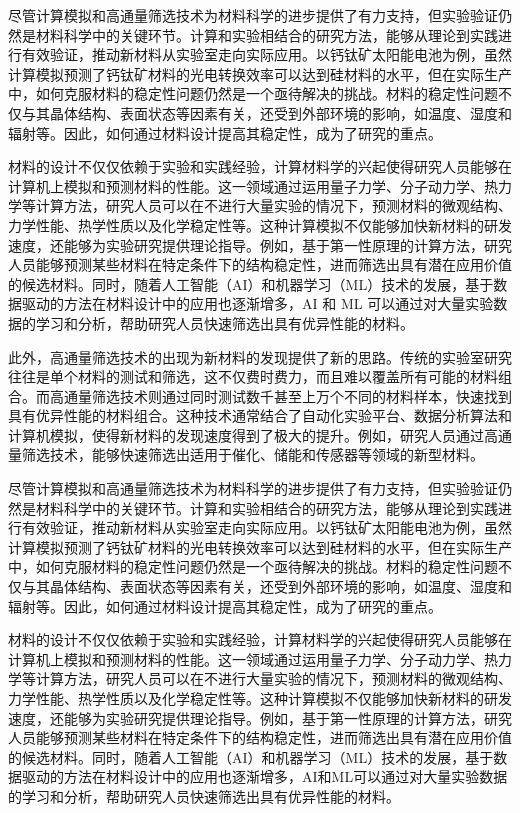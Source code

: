 \begin{multicols}{2}
尽管计算模拟和高通量筛选技术为材料科学的进步提供了有力支持，但实验验证仍然是材料科学中的关键环节。计算和实验相结合的研究方法，能够从理论到实践进行有效验证，推动新材料从实验室走向实际应用。以钙钛矿太阳能电池为例，虽然计算模拟预测了钙钛矿材料的光电转换效率可以达到硅材料的水平，但在实际生产中，如何克服材料的稳定性问题仍然是一个亟待解决的挑战。材料的稳定性问题不仅与其晶体结构、表面状态等因素有关，还受到外部环境的影响，如温度、湿度和辐射等。因此，如何通过材料设计提高其稳定性，成为了研究的重点。

材料的设计不仅仅依赖于实验和实践经验，计算材料学的兴起使得研究人员能够在计算机上模拟和预测材料的性能。这一领域通过运用量子力学、分子动力学、热力学等计算方法，研究人员可以在不进行大量实验的情况下，预测材料的微观结构、力学性能、热学性质以及化学稳定性等。这种计算模拟不仅能够加快新材料的研发速度，还能够为实验研究提供理论指导。例如，基于第一性原理的计算方法，研究人员能够预测某些材料在特定条件下的结构稳定性，进而筛选出具有潜在应用价值的候选材料。同时，随着人工智能（AI）和机器学习（ML）技术的发展，基于数据驱动的方法在材料设计中的应用也逐渐增多，AI 和 ML 可以通过对大量实验数据的学习和分析，帮助研究人员快速筛选出具有优异性能的材料。

此外，高通量筛选技术的出现为新材料的发现提供了新的思路。传统的实验室研究往往是单个材料的测试和筛选，这不仅费时费力，而且难以覆盖所有可能的材料组合。而高通量筛选技术则通过同时测试数千甚至上万个不同的材料样本，快速找到具有优异性能的材料组合。这种技术通常结合了自动化实验平台、数据分析算法和计算机模拟，使得新材料的发现速度得到了极大的提升。例如，研究人员通过高通量筛选技术，能够快速筛选出适用于催化、储能和传感器等领域的新型材料。

尽管计算模拟和高通量筛选技术为材料科学的进步提供了有力支持，但实验验证仍然是材料科学中的关键环节。计算和实验相结合的研究方法，能够从理论到实践进行有效验证，推动新材料从实验室走向实际应用。以钙钛矿太阳能电池为例，虽然计算模拟预测了钙钛矿材料的光电转换效率可以达到硅材料的水平，但在实际生产中，如何克服材料的稳定性问题仍然是一个亟待解决的挑战。材料的稳定性问题不仅与其晶体结构、表面状态等因素有关，还受到外部环境的影响，如温度、湿度和辐射等。因此，如何通过材料设计提高其稳定性，成为了研究的重点。

材料的设计不仅仅依赖于实验和实践经验，计算材料学的兴起使得研究人员能够在计算机上模拟和预测材料的性能。这一领域通过运用量子力学、分子动力学、热力学等计算方法，研究人员可以在不进行大量实验的情况下，预测材料的微观结构、力学性能、热学性质以及化学稳定性等。这种计算模拟不仅能够加快新材料的研发速度，还能够为实验研究提供理论指导。例如，基于第一性原理的计算方法，研究人员能够预测某些材料在特定条件下的结构稳定性，进而筛选出具有潜在应用价值的候选材料。同时，随着人工智能（AI）和机器学习（ML）技术的发展，基于数据驱动的方法在材料设计中的应用也逐渐增多，AI和ML可以通过对大量实验数据的学习和分析，帮助研究人员快速筛选出具有优异性能的材料。


\end{multicols}
